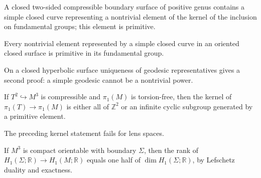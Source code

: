 \begin{corollary}
\label{cor:chow-iv-compressible-boundary}
A closed two-sided compressible boundary surface of positive genus contains a
simple closed curve representing a nontrivial element of the kernel of the
inclusion on fundamental groups; this element is primitive.
\end{corollary}

\begin{lemma}
\label{lem:chow-iv-simple-curve-primitive}
Every nontrivial element represented by a simple closed curve in an oriented
closed surface is primitive in its fundamental group.
\end{lemma}

\begin{remark}
\label{rem:chow-iv-geodesic-primitivity}
On a closed hyperbolic surface uniqueness of geodesic representatives gives a
second proof: a simple geodesic cannot be a nontrivial power.
\end{remark}

\begin{lemma}
\label{lem:chow-iv-compressible-torus-kernel}
If \(T^2\hookrightarrow M^3\) is compressible and \(\pi_1(M)\) is torsion-free,
then the kernel of \(\pi_1(T)\to\pi_1(M)\) is either all of \(\mathbb Z^2\) or
an infinite cyclic subgroup generated by a primitive element.
\end{lemma}

\begin{remark}
\label{rem:chow-iv-compressible-torus-lens-space}
The preceding kernel statement fails for lens spaces.
\end{remark}

\begin{lemma}
\label{lem:chow-iv-boundary-h1-rank}
If \(M^3\) is compact orientable with boundary \(\Sigma\), then the rank of
\(H_1(\Sigma;\mathbb R)\to H_1(M;\mathbb R)\) equals one half of
\(\dim H_1(\Sigma;\mathbb R)\), by Lefschetz duality and exactness.
\end{lemma}

